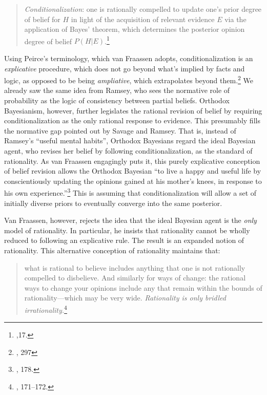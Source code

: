\begin{quote}
\emph{Conditionalization}: one is rationally compelled to update one's
prior degree of belief for \(H\) in light of the acquisition of relevant
evidence \(E\) via the application of Bayes' theorem, which determines
the posterior opinion degree of belief \(P(H|E)\).\footnote{\cite{beliefuly},17.}
\end{quote}



Using Peirce's terminology, which van Fraassen adopts,
conditionalization is an \emph{explicative} procedure, which does not go
beyond what's implied by facts and logic, as opposed to be being
\emph{ampliative}, which extrapolates beyond them.\footnote{\cite{probabilityofinduction}, 297} We already saw the same idea from Ramsey,
who sees the normative role of probability as the logic of consistency
between partial beliefs. Orthodox Bayesianism, however, further
legislates the rational revision of belief by requiring
conditionalization as the only rational response to evidence. This presumably fills the normative gap pointed out by Savage
and Ramsey. That is, instead of Ramsey's ``useful mental habits'', Orthodox
Bayesians regard the ideal Bayesian agent, who revises her belief by
following conditionalization, as the standard of rationality. As van
Fraassen engagingly puts it, this purely explicative conception of
belief revision allows the Orthodox Bayesian ``to live a happy and
useful life by conscientiously updating the opinions gained at his
mother's knees, in response to his own experience.''\footnote{\cite{bvflaws}, 178.} This is assuming that
conditionalization will allow a set of initially diverse priors to
eventually converge into the same posterior.

Van Fraassen, however, rejects the idea that the ideal Bayesian agent is
the \emph{only} model of rationality. In particular, he insists that
rationality cannot be wholly reduced to following an explicative rule.
The result is an expanded notion of rationality. This alternative
conception of rationality maintains that:

\begin{quote}
what is rational to believe includes anything that one is not rationally
compelled to disbelieve. And similarly for ways of change: the rational
ways to change your opinions include any that remain within the bounds
of rationality---which may be very wide. \emph{Rationality is only
bridled irrationality.}\footnote{\cite{bvflaws}, 171--172.}
\end{quote}

